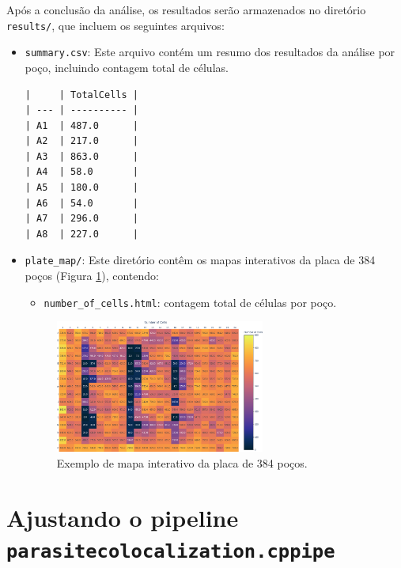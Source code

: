 \documentclass{article}
\begin{document}
Após a conclusão da análise, os resultados serão armazenados no diretório \texttt{results/}, que incluem os seguintes arquivos:

\begin{itemize}
  \item \texttt{summary.csv}: Este arquivo contém um resumo dos resultados da análise por poço, incluindo contagem total de células.

\begin{verbatim}
|     | TotalCells |
| --- | ---------- |
| A1  | 487.0      |
| A2  | 217.0      |
| A3  | 863.0      |
| A4  | 58.0       |
| A5  | 180.0      |
| A6  | 54.0       |
| A7  | 296.0      |
| A8  | 227.0      |
\end{verbatim}
  
  \item \texttt{plate\_map/}: Este diretório contêm os mapas interativos da placa de 384 poços (Figura \ref{fig:plate_map}), contendo:

  \begin{itemize}
    \item \texttt{number\_of\_cells.html}: contagem total de células por poço.
  \end{itemize}

  \begin{figure}[H]
    \centering
    \includegraphics[width=0.65\textwidth]{images/example_plate_map.png}
    \caption{Exemplo de mapa interativo da placa de 384 poços.}
    \label{fig:plate_map}
  \end{figure}

\end{itemize}

\section{Ajustando o pipeline \texttt{parasitecolocalization.cppipe}}
\end{document}

